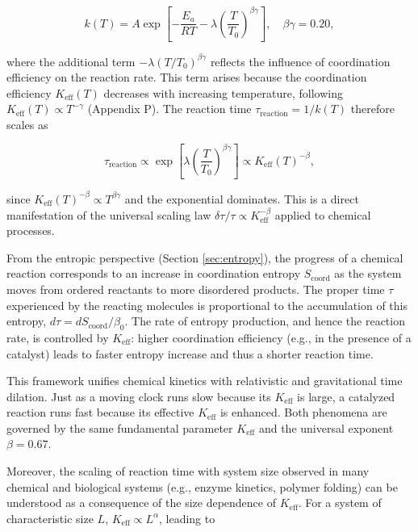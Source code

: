 \documentclass[12pt,a4paper]{article}
\newcommand{\Keff}{K_{\mathrm{eff}}}
\newcommand{\Scoord}{S_{\mathrm{coord}}}
\begin{document}
	\begin{equation}
		k(T) = A \exp\left[-\frac{E_a}{RT} - \lambda \left(\frac{T}{T_0}\right)^{\beta\gamma}\right], \quad \beta\gamma = 0.20,
	\end{equation}
	
	where the additional term \(-\lambda (T/T_0)^{\beta\gamma}\) reflects the influence of coordination efficiency on the reaction rate. This term arises because the coordination efficiency \(\Keff(T)\) decreases with increasing temperature, following \(\Keff(T) \propto T^{-\gamma}\) (Appendix P). The reaction time \(\tau_{\mathrm{reaction}} = 1/k(T)\) therefore scales as
	
	\begin{equation}
		\tau_{\mathrm{reaction}} \propto \exp\left[\lambda \left(\frac{T}{T_0}\right)^{\beta\gamma}\right] \propto \Keff(T)^{-\beta},
	\end{equation}
	
	since \(\Keff(T)^{-\beta} \propto T^{\beta\gamma}\) and the exponential dominates. This is a direct manifestation of the universal scaling law \(\delta \tau / \tau \propto \Keff^{-\beta}\) applied to chemical processes.
	
	From the entropic perspective (Section \ref{sec:entropy}), the progress of a chemical reaction corresponds to an increase in coordination entropy \(\Scoord\) as the system moves from ordered reactants to more disordered products. The proper time \(\tau\) experienced by the reacting molecules is proportional to the accumulation of this entropy, \(d\tau = d\Scoord / \beta_0\). The rate of entropy production, and hence the reaction rate, is controlled by \(\Keff\): higher coordination efficiency (e.g., in the presence of a catalyst) leads to faster entropy increase and thus a shorter reaction time.
	
	This framework unifies chemical kinetics with relativistic and gravitational time dilation. Just as a moving clock runs slow because its \(\Keff\) is large, a catalyzed reaction runs fast because its effective \(\Keff\) is enhanced. Both phenomena are governed by the same fundamental parameter \(\Keff\) and the universal exponent \(\beta = 0.67\).
	
	Moreover, the scaling of reaction time with system size observed in many chemical and biological systems (e.g., enzyme kinetics, polymer folding) can be understood as a consequence of the size dependence of \(\Keff\). For a system of characteristic size \(L\), \(\Keff \propto L^{\alpha}\), leading to
	
\end{document}
